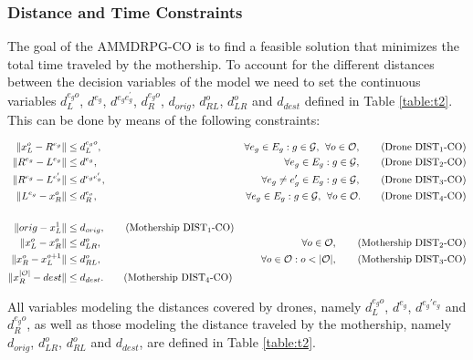 \documentclass[10pt,a4paper]{elsarticle}
\def\AMDCO{{\sf AMMDRPG-CO\xspace}}
\begin{document}
\subsubsection*{Distance and Time Constraints}
\noindent
The goal of the \AMDCO\xspace is to find a feasible solution that minimizes the total time traveled by the mothership. To account for the different distances between the decision variables of the model we need to set the continuous variables $d_L^{e_go}$, $d^{e_g}$, $d^{e_ge^\prime_g}$, $d_R^{e_go}$, $d_{orig}$, $d_{RL}^o$, $d_{LR}^o$ and $d_{dest}$ defined in Table \ref{table:t2}. This can be done by means of the following constraints:

\begin{align*}
\|x_L^o- R^{e_g}\| & \leq  d_L^{e_go},  &\forall e_g\in E_g:g\in \mathcal{G}, \:\:\forall o\in \mathcal O, \tag{Drone DIST$_{1}$-CO} \label{eq:drone-d1-async-CO}\\
\|R^{e_g}- L^{e_g}\| & \leq  d^{e_g},  &\forall e_g\in E_g:g\in \mathcal{G}, \tag{Drone DIST$_{2}$-CO} \label{eq:drone-d2-async-CO}\\
\|R^{e_g}- L^{e'_g}\| & \leq  d^{e_ge'_g}, &\forall e_g\neq e_g'\in E_g:g\in \mathcal{G}, \tag{Drone DIST$_{3}$-CO} \label{eq:drone-d3-async-CO}\\
\|L^{e_g}- x_R^o\| & \leq  d_R^{e_o}, &\forall e_g\in E_g:g\in \mathcal{G},\:\:\forall o\in \mathcal O. \tag{Drone DIST$_{4}$-CO} \label{eq:drone-d4-async-CO}\\\\
\|orig - x_L^1\| & \leq d_{orig}, \tag{Mothership DIST$_1$-CO}\label{eq:mothership-d1-async-CO}\\
\|x_L^o - x_R^{o}\| & \leq d_{LR}^{o}, &\forall o\in\mathcal O, \tag{Mothership DIST$_{2}$-CO}\label{eq:mothership-d3-async-CO}\\
\|x_R^o - x_L^{o+1}\| & \leq d_{RL}^{o}, &\forall o\in\mathcal O:o<|\mathcal O|, \tag{Mothership DIST$_{3}$-CO}\label{eq:mothership-d4-async-CO}\\
\|x_R^{|\mathcal O|} - dest\| & \leq d_{dest}. \tag{Mothership DIST$_4$-CO}\label{eq:mothership-d6-async-CO}
\end{align*}

\noindent
All variables modeling the distances covered by drones, namely $d_L^{e_go}$, $d^{e_g}$, $d^{e_g'e_g}$ and $d_R^{e_go}$,  as well as those modeling the distance traveled by the mothership, namely $d_{orig}$, $d_{LR}^o$, $d_{RL}^o$ and $d_{dest}$, are defined in Table \ref{table:t2}. 
\end{document}

